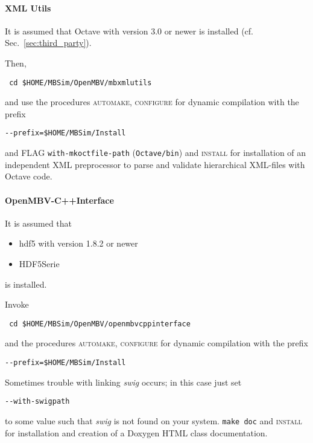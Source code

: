 \paragraph{XML Utils}
It is assumed that Octave with version 3.0 or newer is installed (cf. Sec.~\ref{sec:third_party}).\par
Then,
\begin{verbatim}
 cd $HOME/MBSim/OpenMBV/mbxmlutils
\end{verbatim} 
and use the procedures \textsc{automake}, \textsc{configure} for dynamic compilation with the prefix
\begin{verbatim}
--prefix=$HOME/MBSim/Install
\end{verbatim}
and FLAG \texttt{\-\-with-mkoctfile-path} (\texttt{Octave/bin}) and \textsc{install} for installation of an independent XML preprocessor to parse and validate hierarchical XML-files with Octave code.

\paragraph{OpenMBV-C++Interface}
It is assumed that 
\begin{itemize}
\item hdf5 with version 1.8.2 or newer
\item HDF5Serie 
\end{itemize}
is installed.\par
Invoke
\begin{verbatim}
 cd $HOME/MBSim/OpenMBV/openmbvcppinterface
\end{verbatim} 
and the procedures \textsc{automake, configure} for dynamic compilation with the prefix
\begin{verbatim}
--prefix=$HOME/MBSim/Install
\end{verbatim}
Sometimes trouble with linking \emph{swig} occurs; in this case just set
\begin{verbatim}
--with-swigpath
\end{verbatim}
to some value such that \emph{swig} is not found on your system.
\texttt{make doc} and \textsc{install} for installation and creation of a Doxygen HTML class documentation. 

